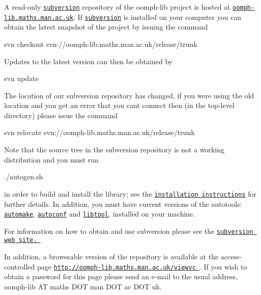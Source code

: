 A read-\/only \href{http://subversion.tigris.org/}{\tt subversion} repository of the oomph-\/lib project is hosted at \href{http://oomph-lib.maths.man.ac.uk}{\tt oomph-\/lib.\+maths.\+man.\+ac.\+uk}. If \href{http://subversion.tigris.org/}{\tt subversion} is installed on your computer you can obtain the latest snapshot of the project by issuing the command


\begin{DoxyCode}
svn checkout svn:\textcolor{comment}{//oomph-lib.maths.man.ac.uk/release/trunk}
\end{DoxyCode}


Updates to the latest version can then be obtained by


\begin{DoxyCode}
svn update
\end{DoxyCode}


The location of our subversion repository has changed, if you were using the old location and you get an error that you can\textquotesingle{}t connect then (in the top-\/level directory) please issue the command 
\begin{DoxyCode}
svn relocate svn:\textcolor{comment}{//oomph-lib.maths.man.ac.uk/release/trunk}
\end{DoxyCode}


Note that the source tree in the subversion repository is not a working distribution and you must run


\begin{DoxyCode}
./autogen.sh
\end{DoxyCode}


in order to build and install the library; see the \href{../../the_distribution/html/index.html}{\tt installation instructions} for further details. In addition, you must have current versions of the autotools\+: \href{http://www.gnu.org/software/automake/}{\tt automake}, \href{http://www.gnu.org/software/autoconf/}{\tt autoconf} and \href{http://www.gnu.org/software/libtool/}{\tt libtool}, installed on your machine.

For information on how to obtain and use subversion please see the \href{http://subversion.tigris.org/}{\tt subversion web site. }

In addition, a browesable version of the repository is available at the access-\/controlled page \href{http://oomph-lib.maths.man.ac.uk/viewvc}{\tt http\+://oomph-\/lib.\+maths.\+man.\+ac.\+uk/viewvc }. If you wish to obtain a password for this page please send an e-\/mail to the usual address, oomph-\/lib AT maths D\+OT man D\+OT ac D\+OT uk.



